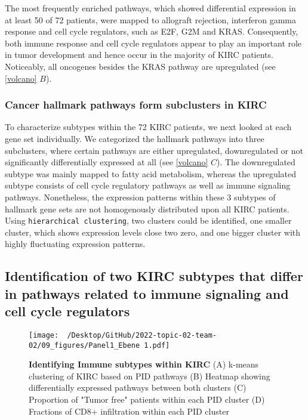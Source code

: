 \documentclass[
  parskip,
  oneside]{scrreprt}
\begin{document}
The most frequently enriched pathways, which showed differential
expression in at least 50 of 72 patients, were mapped to allograft
rejection, interferon gamma response and cell cycle regulators, such as
E2F, G2M and KRAS. Consequently, both immune response and cell cycle
regulators appear to play an important role in tumor development and
hence occur in the majority of KIRC patients. Noticeably, all oncogenes
besides the KRAS pathway are upregulated (see \cref{volcano} \(B\)).

\hypertarget{cancer-hallmark-pathways-form-subclusters-in-kirc}{%
\subsubsection{Cancer hallmark pathways form subclusters in
KIRC}\label{cancer-hallmark-pathways-form-subclusters-in-kirc}}

To characterize subtypes within the 72 KIRC patients, we next looked at
each gene set individually. We categorized the hallmark pathways into
three subclusters, where certain pathways are either upregulated,
downregulated or not significantly differentially expressed at all (see
\cref{volcano} \(C\)). The downregulated subtype was mainly mapped to
fatty acid metabolism, whereas the upregulated subtype consists of cell
cycle regulatory pathways as well as immune signaling pathways.
Nonetheless, the expression patterns within these 3 subtypes of hallmark
gene sets are not homogenously distributed upon all KIRC patients. Using
\texttt{hierarchical\ clustering}, two clusters could be identified, one
smaller cluster, which shows expression levels close two zero, and one
bigger cluster with highly fluctuating expression patterns.

\hypertarget{identification-of-two-kirc-subtypes-that-differ-in-pathways-related-to-immune-signaling-and-cell-cycle-regulators}{%
\subsection{Identification of two KIRC subtypes that differ in pathways
related to immune signaling and cell cycle
regulators}\label{identification-of-two-kirc-subtypes-that-differ-in-pathways-related-to-immune-signaling-and-cell-cycle-regulators}}

\begin{figure}[h]
  \texttt{[image: ~/Desktop/GitHub/2022-topic-02-team-02/09\_figures/Panel1\_Ebene 1.pdf]}
  \caption{\textbf{Identifying Immune subtypes within KIRC }(A) k-means clustering of KIRC based on PID pathways (B) Heatmap showing differentially expressed pathways between both clusters (C) Proportion of "Tumor free" patients within each PID cluster (D) Fractions of CD8+ infiltration within each PID cluster}
  \label{pid}
\end{figure}
\end{document}
